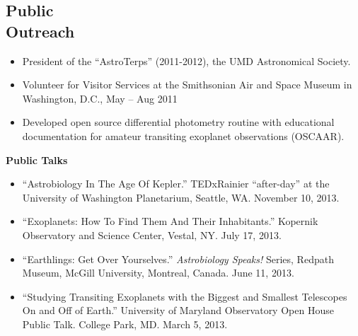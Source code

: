 \documentclass[margin]{res}
\begin{document}
\begin{resume}
\section{Public \\ Outreach}             
            \begin{itemize}   
	   \item President of the ``AstroTerps'' (2011-2012), the UMD Astronomical Society.
            \item Volunteer for Visitor Services at the Smithsonian Air and Space Museum in Washington, D.C., May -- Aug 2011
            \item Developed open source differential photometry routine with educational documentation for amateur transiting exoplanet observations (OSCAAR).\\
            \end{itemize}
	   \textbf{Public Talks}
            \begin{itemize}   
            	\item ``Astrobiology In The Age Of Kepler.'' TEDxRainier ``after-day'' at the University of Washington Planetarium, Seattle, WA. November 10, 2013. 
                \item ``Exoplanets: How To Find Them And Their Inhabitants.'' Kopernik Observatory and Science Center, Vestal, NY. July 17, 2013. 
	       \item ``Earthlings: Get Over Yourselves.'' \textit{Astrobiology Speaks!} Series, Redpath Museum, McGill University, Montreal, Canada. June 11, 2013.	   
	       \item ``Studying Transiting Exoplanets with the Biggest and Smallest Telescopes On and Off of Earth.'' University of Maryland Observatory Open House Public Talk. College Park, MD. March 5, 2013.
            \end{itemize}
            

\end{resume}
\end{document}

